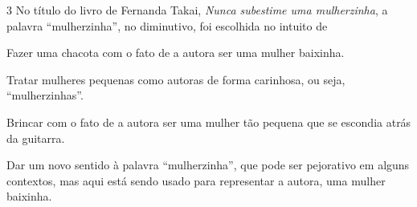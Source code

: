 \num{3} No título do livro de Fernanda Takai, \emph{Nunca subestime uma
mulherzinha}, a palavra ``mulherzinha'', no diminutivo, foi escolhida no
intuito de

\begin{escolha}
\item Fazer uma chacota com o fato de a autora ser uma mulher baixinha.
\item Tratar mulheres pequenas como autoras de forma carinhosa, ou seja,
``mulherzinhas''.
\item Brincar com o fato de a autora ser uma mulher tão pequena que se
escondia atrás da guitarra.
\item Dar um novo sentido à palavra ``mulherzinha'', que pode ser
pejorativo em alguns contextos, mas aqui está sendo usado para
representar a autora, uma mulher baixinha.
\end{escolha}



